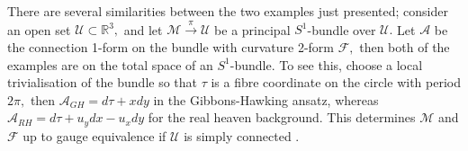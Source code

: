 \documentclass[a4paper,12pt, onecolumn, notitlepage]{article}
\theoremstyle{definition}
\theoremstyle{remark}
\begin{document}
There are several similarities between the two examples just presented; consider an open set $\mathcal{U}\subset\mathbb{R}^{3},$ and let $\mathcal{M}\overset{\pi}{\rightarrow}\mathcal{U}$ be a principal $S^{1}$-bundle over $\mathcal{U}.$ Let $\mathcal{A}$ be the connection 1-form on the bundle with curvature 2-form $\mathcal{F},$ then both of the examples are on the total space of an $S^{1}$-bundle. To see this, choose a local trivialisation of the bundle so that $\tau$ is a fibre coordinate on the circle with period $2\pi,$ then $\mathcal{A}_{GH}=d\tau + xdy$ in the Gibbons-Hawking ansatz, whereas $\mathcal{A}_{RH}=d\tau + u_{y}dx - u_{x}dy$ for the real heaven background. This determines $\mathcal{M}$ and $\mathcal{F}$ up to gauge equivalence if $\mathcal{U}$ is simply connected \cite{lebrun_1991}.

\end{document}
